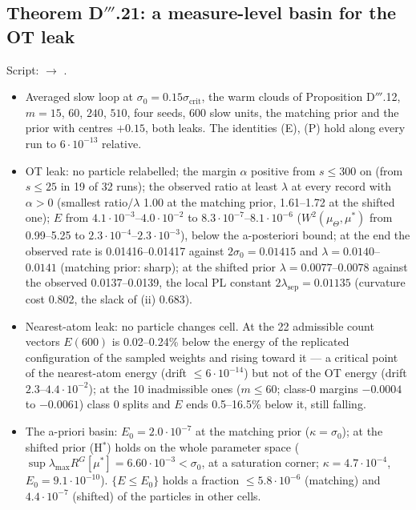 \subsection{Theorem D\texorpdfstring{$'''$}{'''}.21: a measure-level basin for the OT leak}

Script:  $\to$ .
\begin{itemize}
  \item Averaged slow loop at $\sigma_0=0.15\sigma_{\mathrm{crit}}$, the warm clouds of Proposition D$'''$.12,
    $m=15$, $60$, $240$, $510$, four seeds, 600 slow units, the matching prior and the prior with centres $+0.15$,
    both leaks. The identities (E), (P) hold along every run to $6\cdot10^{-13}$ relative.
  \item OT leak: no particle relabelled; the margin $\alpha$ positive from $s\le300$ on (from $s\le25$ in 19 of 32
    runs); the observed ratio at least $\lambda$ at every record with $\alpha>0$ (smallest ratio$/\lambda$ 1.00 at
    the matching prior, 1.61--1.72 at the shifted one); $E$ from $4.1\cdot10^{-3}$--$4.0\cdot10^{-2}$ to
    $8.3\cdot10^{-7}$--$8.1\cdot10^{-6}$ ($W^2(\mu_\Theta,\mu^*)$ from 0.99--5.25 to
    $2.3\cdot10^{-4}$--$2.3\cdot10^{-3}$), below the a-posteriori bound; at the end the observed rate is
    0.01416--0.01417 against $2\sigma_0=0.01415$ and $\lambda=0.0140$--$0.0141$ (matching prior: sharp); at the
    shifted prior $\lambda=0.0077$--$0.0078$ against the observed 0.0137--0.0139, the local PL constant
    $2\lambda_{\mathrm{sep}}=0.01135$ (curvature cost 0.802, the slack of (ii) 0.683).
  \item Nearest-atom leak: no particle changes cell. At the 22 admissible count vectors $E(600)$ is 0.02--0.24\%
    below the energy of the replicated configuration of the sampled weights and rising toward it --- a critical
    point of the nearest-atom energy (drift $\le6\cdot10^{-14}$) but not of the OT energy (drift
    $2.3$--$4.4\cdot10^{-2}$); at the 10 inadmissible ones ($m\le60$; class-0 margins $-0.0004$ to $-0.0061$) class
    0 splits and $E$ ends 0.5--16.5\% below it, still falling.
  \item The a-priori basin: $E_0=2.0\cdot10^{-7}$ at the matching prior ($\kappa=\sigma_0$); at the shifted prior
    (H$^*$) holds on the whole parameter space ($\sup\lambda_{\max}R^G[\mu^*]=6.60\cdot10^{-3}<\sigma_0$, at a
    saturation corner; $\kappa=4.7\cdot10^{-4}$, $E_0=9.1\cdot10^{-10}$). $\{E\le E_0\}$ holds a fraction
    $\le5.8\cdot10^{-6}$ (matching) and $4.4\cdot10^{-7}$ (shifted) of the particles in other cells.

\end{itemize}
